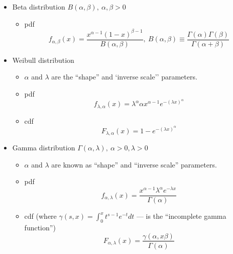 \documentclass[12pt]{article}
\theoremstyle{definition}
\theoremstyle{remark}
\numberwithin{equation}{section}
\begin{document}
\begin{itemize}
\begin{itemize}
	\end{itemize}

	\item Beta distribution $B(\alpha, \beta),\ \alpha, \beta > 0$
	\begin{itemize}
		\item pdf
		\begin{equation}\label{beta_pdf}
			f_{\alpha, \beta}(x) = \frac{x^{\alpha-1} (1-x)^{\beta-1}}{B(\alpha, \beta)},\ B(\alpha, \beta) \equiv \frac{\Gamma(\alpha)\Gamma(\beta)}{\Gamma(\alpha+\beta)}
		\end{equation}

	\end{itemize}

	\item Weibull distribution
	\begin{itemize}
		\item $\alpha$ and $\lambda$ are the ``shape'' and `inverse scale'' parameters.
		\item pdf
		\begin{equation}\label{weibull_pdf}
			f_{\lambda, \alpha}(x) = \lambda^{\alpha}\alpha x^{\alpha-1} e^{-(\lambda x)^{\alpha}}
		\end{equation}
		\item cdf
		\begin{equation}\label{weibull_cdf}
			F_{\lambda, \alpha}(x) = 1 - e^{-(\lambda x)^\alpha}
		\end{equation}
	\end{itemize}

	\item Gamma distribution $\Gamma(\alpha, \lambda),\ \alpha >0, \lambda > 0$
	\begin{itemize}
		\item $\alpha$ and $\lambda$ are known as ``shape'' and ``inverse scale'' parameters.
		\item pdf
			\begin{equation}\label{gamma_pdf}
				f_{\alpha, \lambda} (x)= \frac{x^{\alpha - 1} \lambda^{\alpha}e^{-\lambda x}}{\Gamma(\alpha)}
			\end{equation}
		\item cdf (where $\gamma(s, x) = \int_0^x t^{s-1}e^{-t}dt$ --- is the ``incomplete gamma function'')
			\begin{equation}
				F_{\alpha,\lambda}(x) = \frac{\gamma(\alpha, x\beta)}{\Gamma(\alpha)}
			\end{equation}
	\end{itemize}
\end{itemize}
\end{document}
